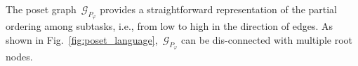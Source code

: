 The poset graph~$\mathcal{G}_{P_\varphi}$ provides a straightforward
representation of the partial ordering among subtasks,
i.e., from low to high in the direction of edges.
As shown in Fig.~\ref{fig:poset_language},~$\mathcal{G}_{P_\varphi}$ can be dis-connected with multiple root nodes.

